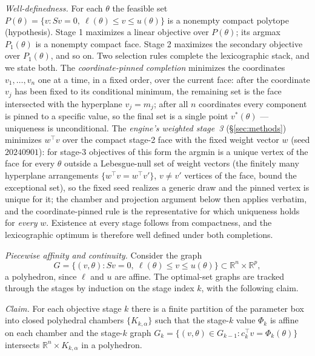 \documentclass[11pt,a4paper]{article}
\theoremstyle{plain}
\theoremstyle{definition}
\theoremstyle{remark}
\newcommand{\RR}{\mathbb{R}}
\begin{document}
\emph{Well-definedness.} For each $\theta$ the feasible set
$P(\theta) = \{v : Sv = 0,\ \ell(\theta) \le v \le u(\theta)\}$ is a
nonempty compact polytope (hypothesis). Stage 1 maximizes a linear
objective over $P(\theta)$; its argmax $P_1(\theta)$ is a nonempty
compact face. Stage 2 maximizes the secondary objective over
$P_1(\theta)$, and so on. Two selection rules complete the
lexicographic stack, and we state both. The \emph{coordinate-pinned
completion} minimizes the coordinates $v_1, \dots, v_n$ one at a
time, in a fixed order, over the current face: after the coordinate
$v_j$ has been fixed to its conditional minimum, the remaining set
is the face intersected with the hyperplane $v_j = m_j$; after all
$n$ coordinates every component is pinned to a specific value, so
the final set is a single point $v^{*}(\theta)$ --- uniqueness is
unconditional. The \emph{engine's weighted stage~3}
(\S\ref{sec:methods}) minimizes $w^{\top}v$ over the compact
stage-2 face with the fixed weight vector $w$ (seed $20240901$):
for stage-3 objectives of this form the argmin is a unique vertex
of the face for every $\theta$ outside a Lebesgue-null set of
weight vectors (the finitely many hyperplane arrangements
$\{w^{\top}v = w^{\top}v'\}$, $v \neq v'$ vertices of the face,
bound the exceptional set), so the fixed seed realizes a generic
draw and the pinned vertex is unique for it; the chamber and
projection argument below then applies verbatim, and the
coordinate-pinned rule is the representative for which uniqueness
holds for \emph{every} $w$. Existence at every stage follows from
compactness, and the lexicographic optimum is therefore well
defined under both completions.

\emph{Piecewise affinity and continuity.} Consider the graph
\[
G = \bigl\{(v, \theta) : Sv = 0,\ \ell(\theta) \le v \le u(\theta)
\bigr\} \subset \RR^{n} \times \RR^{p},
\]
a polyhedron, since $\ell$ and $u$ are affine. The optimal-set
graphs are tracked through the stages by induction on the stage
index $k$, with the following claim.

\emph{Claim.} For each objective stage $k$ there is a finite
partition of the parameter box into closed polyhedral chambers
$\{K_{k,\alpha}\}$ such that the stage-$k$ value $\Phi_k$ is affine
on each chamber and the stage-$k$ graph $G_k = \{(v,\theta) \in
G_{k-1} : c_k^{\top}v = \Phi_k(\theta)\}$ intersects
$\RR^{n} \times K_{k,\alpha}$ in a polyhedron.
\end{document}

